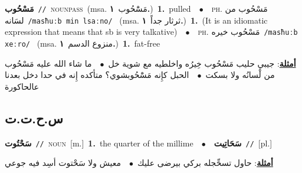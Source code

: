 \documentclass[10pt,a4paper,twoside]{article} %
\begin{document}
\begin{multicols}{2}
{\setlength\topsep{0pt}\textbf{\foreignlanguage{arabic}{مَسْحُوب}}\ {\color{gray}\texttt{//}\color{black}}\ \textsc{noun\textunderscore pass}\ \color{gray}(msa. \foreignlanguage{arabic}{مَسَْحُوب}~\foreignlanguage{arabic}{\textbf{١.}})\color{black}\ \textbf{1.}~pulled\ \ $\bullet$\ \ \textsc{ph.} \color{gray} \foreignlanguage{arabic}{مَسْحُوب من لسَانه}\color{black}\ {\color{gray}\texttt{/{\sffamily masħuːb min lsaːno}/}\color{black}}\ \color{gray} (msa. \foreignlanguage{arabic}{ثرثار جداً}~\foreignlanguage{arabic}{\textbf{١.}})\color{black}\ \textbf{1.}~(It is an idiomatic expression that means that sb is very talkative)\ \ $\bullet$\ \ \textsc{ph.} \color{gray} \foreignlanguage{arabic}{مَسْحُوب خيره}\color{black}\ {\color{gray}\texttt{/{\sffamily masħuːb xeːro}/}\color{black}}\ \color{gray} (msa. \foreignlanguage{arabic}{منزوع الدسم}~\foreignlanguage{arabic}{\textbf{١.}})\color{black}\ \textbf{1.}~fat-free\  \begin{flushright}\color{gray}\foreignlanguage{arabic}{\textbf{\underline{\foreignlanguage{arabic}{أمثلة}}}: جيبي حليب مَسْحُوب خِيرُه واخلطيه مع شوية خل\ $\bullet$\ \  ما شاء الله عليه مَسْحُوب من لْسانُه ولا بسكت\ $\bullet$\ \  الحبل كإِنه مَسَْحُوبشوي؟ متأكده إِنه في حدا دخل بعدنا عالحاكورة}\end{flushright}\color{black}} \vspace{2mm}

\vspace{-3mm}
\subsection*{\color{blue}\foreignlanguage{arabic}{س.ح.ت.ت}\color{blue}{ (ntws)}} 

{\setlength\topsep{0pt}\textbf{\foreignlanguage{arabic}{سَحْتُوت}}\ {\color{gray}\texttt{//}\color{black}}\ \textsc{noun}\ [m.]\ \textbf{1.}~the quarter of the millime\ \ $\bullet$\ \ \setlength\topsep{0pt}\textbf{\foreignlanguage{arabic}{سَحَاتِيت}}\ {\color{gray}\texttt{//}\color{black}}\ [pl.]\  \begin{flushright}\color{gray}\foreignlanguage{arabic}{\textbf{\underline{\foreignlanguage{arabic}{أمثلة}}}: حاول تسحِّجله بركي بيرضى عليك\ $\bullet$\ \  معيش ولا سَحْتوت أسِد فيه جوعي}\end{flushright}\color{black}} \vspace{2mm}


\end{multicols}
\end{document}
